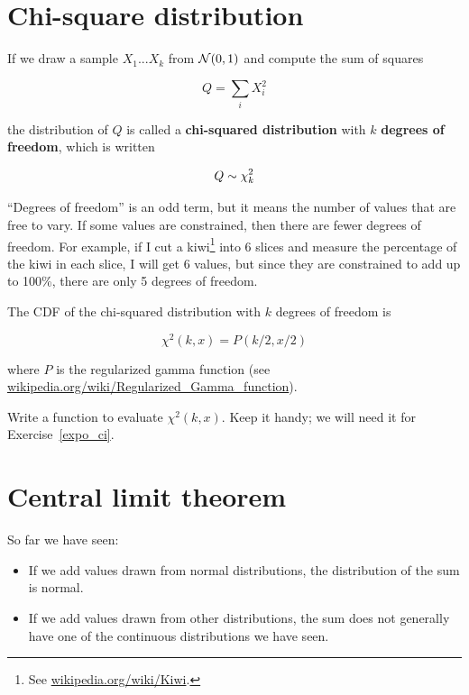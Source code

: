 \documentclass[12pt]{book}
\begin{document}
\section{Chi-square distribution}

If we draw a sample $X_1 ... X_k$ from $\mathcal{N}(0,1)$ and compute
the sum of squares

\[ Q = \sum_i X_i^2 \]

the distribution of $Q$ is called a {\bf chi-squared distribution} with
$k$ {\bf degrees of freedom}, which is written

\[ Q \sim \chi_k^2 \]

``Degrees of freedom'' is an odd term, but it means the number of
values that are free to vary.  If some values are constrained, then
there are fewer degrees of freedom.  For example, if I cut a
kiwi\footnote{See \url{wikipedia.org/wiki/Kiwi}.} into 6 slices and
measure the percentage of the kiwi in each slice, I will get 6 values,
but since they are constrained to add up to 100\%, there are only 5
degrees of freedom.

The CDF of the chi-squared distribution with $k$ degrees of freedom is

\[ \chi^2(k, x) = P(k/2, x/2) \]

where $P$ is the regularized gamma function (see
\url{wikipedia.org/wiki/Regularized_Gamma_function}).

\begin{ex}
\label{chi-squared}

Write a function to evaluate $\chi^2(k, x)$.  Keep it handy; we will
need it for Exercise~\ref{expo_ci}.

\end{ex}



\section{Central limit theorem}
\label{CLT}

So far we have seen:

\begin{itemize}

\item If we add values drawn from normal distributions, the distribution
of the sum is normal.

\item If we add values drawn from other distributions, the sum does not
generally have one of the continuous distributions we have seen.

\end{itemize}
\end{document}
